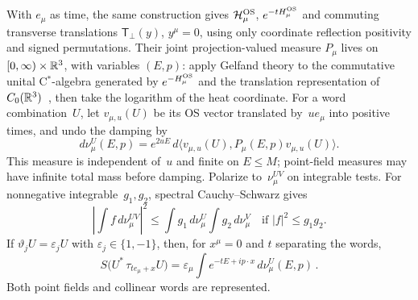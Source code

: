 With $e_\mu$ as time, the same construction gives $\mathcal H_\mu^{\rm OS}$, $e^{-tH_\mu^{\rm OS}}$ and commuting transverse translations $\mathsf T_\perp(y)$, $y^\mu=0$, using only coordinate reflection positivity and signed permutations. Their joint projection-valued measure $P_\mu$ lives on $[0,\infty)\times\mathbb{R}^3$, with variables $(E,p)$: apply Gelfand theory to the commutative unital C$^*$-algebra generated by $e^{-H_\mu^{\rm OS}}$ and the translation representation of $C_0(\mathbb{R}^3)$~\cite[Theorems~2.4.1, 3.7.11, equation~(3.89) and Proposition~4.2.3]{Landsman1998}, then take the logarithm of the heat coordinate. For a word combination~$U$, let $v_{\mu,u}(U)$ be its OS vector translated by~$ue_\mu$ into positive times, and undo the damping by
\begin{equation}\label{eq:H-coordinate-measure}
d\nu_\mu^U(E,p)=e^{2uE}\,d\langle v_{\mu,u}(U),P_\mu(E,p)v_{\mu,u}(U)\rangle .
\end{equation}
This measure is independent of~$u$ and finite on $E\le M$; point-field measures may have infinite total mass before damping. Polarize to~$\nu_\mu^{UV}$ on integrable tests. For nonnegative integrable~$g_1,g_2$, spectral Cauchy--Schwarz gives
\begin{equation}\label{eq:H-coordinate-CS}
\left|\int f\,d\nu_\mu^{UV}\right|^2\le\int g_1\,d\nu_\mu^U\int g_2\,d\nu_\mu^V
\quad\text{if }|f|^2\le g_1g_2.
\end{equation}
If $\vartheta_jU=\varepsilon_jU$ with $\varepsilon_j\in\{1,-1\}$, then, for $x^\mu=0$ and $t$ separating the words,
\begin{equation*}
S\bigl(U^*\,\tau_{te_\mu+x}U\bigr)
=\varepsilon_\mu\int e^{-tE+ip\cdot x}\,d\nu_\mu^U(E,p)\,.
\end{equation*}
Both point fields and collinear words are represented.

